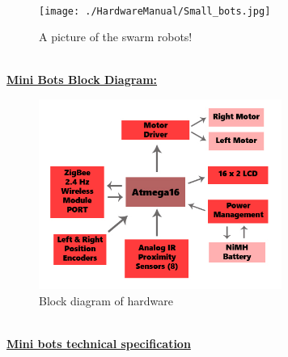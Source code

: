 \documentclass[a4paper,12pt,oneside]{book}
\begin{document}
	\hfill\\
	\begin{figure}[h!]
		\caption{A picture of the swarm robots!}
		\texttt{[image: ./HardwareManual/Small\_bots.jpg]}		
	\end{figure}	
	\hfill\\
	\newpage
	\underline{\textbf{\Large{Mini Bots Block Diagram:}}}
	
	\begin{figure}[h!]
		\caption{Block diagram of hardware}
		\includegraphics[width=300px]{./Block_Diagram.jpg}
	\end{figure}
	\newpage
	\hfill\\
	\underline{\textbf{\Large{Mini bots technical specification}}}
\end{document}
